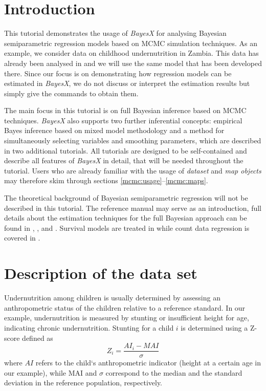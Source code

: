 \section{Introduction}\label{mcmc:data}

This tutorial demonstrates the usage of {\it BayesX} for analysing Bayesian semiparametric regression models based on MCMC
simulation techniques. As an example, we consider data on childhood undernutrition in Zambia. This data has already been
analysed in  and we will use the same model that has been developed there. Since our focus is on
demonstrating how regression models can be estimated in {\it BayesX}, we do not discuss or interpret the estimation results but
simply give the commands to obtain them.

The main focus in this tutorial is on full Bayesian inference based on MCMC techniques. {\it BayesX} also supports two further
inferential concepts: empirical Bayes inference based on mixed model methodology and a method for simultaneously selecting
variables and smoothing parameters, which are described in two additional tutorials. All tutorials are designed to be
self-contained and describe all features of {\it BayesX} in detail, that will be needed throughout the tutorial. Users who are
already familiar with the usage of {\it dataset} and {\it map objects} may therefore skim through sections
\ref{mcmc:usage}--\ref{mcmc:maps}.

The theoretical background of Bayesian semiparametric regression will not be described in this tutorial. The reference manual
may serve as an introduction, full details about the estimation techniques for the full Bayesian approach can be found in
, ,  and . Survival models are treated in
 while count data regression is covered in .

\section{Description of the data set}

Undernutrition among children is usually determined by assessing an anthropometric status of the children relative to a
reference standard. In our example, undernutrition is measured by stunting or insufficient height for age, indicating chronic
undernutrition. Stunting for a child $i$ is determined using a Z-score defined as
\[
Z_i = \frac{AI_i-MAI}{\sigma}
\]
where $AI$ refers to the child`s anthropometric indicator (height at a certain age in our example), while MAI and $\sigma$
correspond to the median and the standard deviation in the reference population, respectively.

